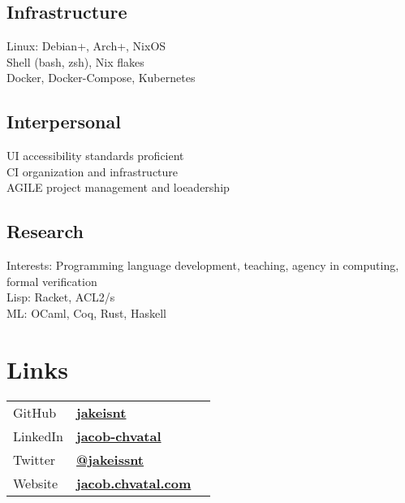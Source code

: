 \documentclass[letterpaper]{cv} %
\begin{document}
\begin{minipage}[t]{0.33\textwidth}
  \subsection{Infrastructure}
  \textbullet{} Linux: Debian+, Arch+, NixOS \\
  \textbullet{}Shell (bash, zsh), Nix flakes \\
  \textbullet{} Docker, Docker-Compose, Kubernetes \\

  \sectionspace
  \subsection{Interpersonal}
  \textbullet{} UI accessibility standards proficient \\
  \textbullet{} CI organization and infrastructure \\
  \textbullet{} AGILE project management and loeadership \\

  \sectionspace
  \subsection{Research}
  Interests: Programming language development,
  teaching, agency in computing, formal verification \\
  \textbullet{} Lisp: Racket, ACL2/s \\
  \textbullet{} ML: OCaml, Coq, Rust, Haskell \\
  \sectionspace

  \section{Links}
  \begin{tabular}[t]{lll}
  GitHub &\href{https://github.com/jakeisnt}{\bf jakeisnt} \\
  LinkedIn &\href{https://www.linkedin.com/in/jacob-chvatal}{\bf jacob-chvatal} \\
  Twitter &\href{https://twitter.com/jakeissnt}{\bf @jakeissnt} \\
  Website &\href{https://jacob.chvatal.com}{\bf jacob.chvatal.com} \\
  \end{tabular}
  \sectionspace


\end{minipage} %
\end{document}
